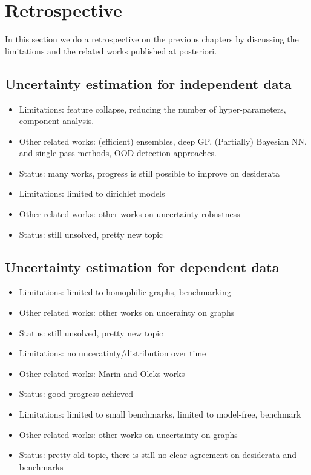 \chapter{Retrospective}
\label{chap:retrospective}

In this section we do a retrospective on the previous chapters by discussing the limitations and the related works published at posteriori.

\section{Uncertainty estimation for independent data}

\begin{itemize}
    \item Limitations: feature collapse, reducing the number of hyper-parameters, component analysis.
    \item Other related works: (efficient) ensembles, deep GP, (Partially) Bayesian NN, and single-pass methods, OOD detection approaches.
    \item Status: many works, progress is still possible to improve on desiderata
\end{itemize}

\begin{itemize}
    \item Limitations: limited to dirichlet models
    \item Other related works: other works on uncertainty robustness
    \item Status: still unsolved, pretty new topic
\end{itemize}

\section{Uncertainty estimation for dependent data}

\begin{itemize}
    \item Limitations: limited to homophilic graphs, benchmarking
    \item Other related works: other works on uncerainty on graphs
    \item Status: still unsolved, pretty new topic
\end{itemize}

\begin{itemize}
    \item Limitations: no unceratinty/distribution over time
    \item Other related works: Marin and Oleks works
    \item Status: good progress achieved
\end{itemize}

\begin{itemize}
    \item Limitations: limited to small benchmarks, limited to model-free, benchmark
    \item Other related works: other works on uncertainty on graphs
    \item Status: pretty old topic, there is still no clear agreement on desiderata and benchmarks
\end{itemize}